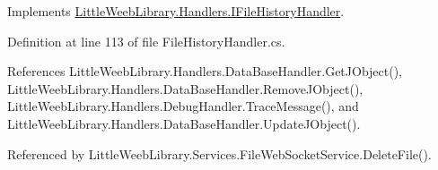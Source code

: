 Implements \mbox{\hyperlink{interface_little_weeb_library_1_1_handlers_1_1_i_file_history_handler_afcfb45f7f8a2161350d0b78c25a3d0d3}{Little\+Weeb\+Library.\+Handlers.\+I\+File\+History\+Handler}}.



Definition at line 113 of file File\+History\+Handler.\+cs.



References Little\+Weeb\+Library.\+Handlers.\+Data\+Base\+Handler.\+Get\+J\+Object(), Little\+Weeb\+Library.\+Handlers.\+Data\+Base\+Handler.\+Remove\+J\+Object(), Little\+Weeb\+Library.\+Handlers.\+Debug\+Handler.\+Trace\+Message(), and Little\+Weeb\+Library.\+Handlers.\+Data\+Base\+Handler.\+Update\+J\+Object().



Referenced by Little\+Weeb\+Library.\+Services.\+File\+Web\+Socket\+Service.\+Delete\+File().



